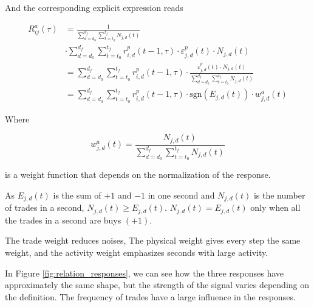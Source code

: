 And the corresponding explicit expression reads

\begin{align}
    R_{ij}^{a}\left(\tau\right)&=\frac{1}{\sum_{d=d_{0}}^{d_{f}}
    \sum_{t=t_{0}}^{t_{f}}N_{j,d} \left(t\right)} \nonumber \\
    &\cdot\sum_{d=d_{0}}^{d_{f}}\sum_{t=t_{0}}^{t_{f}}r^{p}_{i,d}
    \left(t-1,\tau\right) \cdot\varepsilon_{j,d}^{p}\left(t\right)\cdot N_{j,d}
    \left(t\right)\\
    &=\sum_{d=d_{0}}^{d_{f}} \sum_{t=t_{0}}^{t_{f}}r^{p}_{i,d}
    \left(t-1,\tau\right) \cdot\frac{\varepsilon_{j,d}^{p}\left(t \right)
    \cdot N_{j,d}\left(t\right)} {\sum_{d=d_{0}}^{d_{f}}\sum_{t=t_{0}}^{t_{f}}
    N_{j,d}\left(t \right)} \nonumber \\
    &=\sum_{d=d_{0}}^{d_{f}} \sum_{t=t_{0}}^{t_{f}}r^{p}_{i,d}
    \left(t-1,\tau\right) \cdot\text{sgn}\left(E_{j,d}\left(t\right)\right)
    \cdot w_{j,d}^{a}\left(t\right)
\end{align}

Where

\begin{equation}
    w_{j,d}^{a}\left(t\right) = \frac{N_{j,d}\left(t \right)}
    {\sum_{d=d_{0}}^{d_{f}}\sum_{t=t_{0}}^{t_{f}}N_{j,d}\left(t\right)}
\end{equation}

is a weight function that depends on the normalization of the response.

As $E_{j,d}\left(t\right)$ is the sum of $+1$ and $-1$ in one second and
$N_{j,d}\left(t\right)$ is the number of trades in a second,
$N_{j,d}\left(t\right) \ge E_{j,d}\left(t\right)$.
$N_{j,d}\left(t\right) = E_{j,d}\left(t\right)$ only when all the trades in a
second are buys $(+1)$.

The trade weight reduces noises, The physical weight gives every step the same
weight, and the activity weight emphasizes seconds with large activity.

In Figure \ref{fig:relation_responses}, we can see how the three
responses have approximately the same shape, but the strength of the signal
varies depending on the definition. The frequency of trades have a large
influence in the responses.

